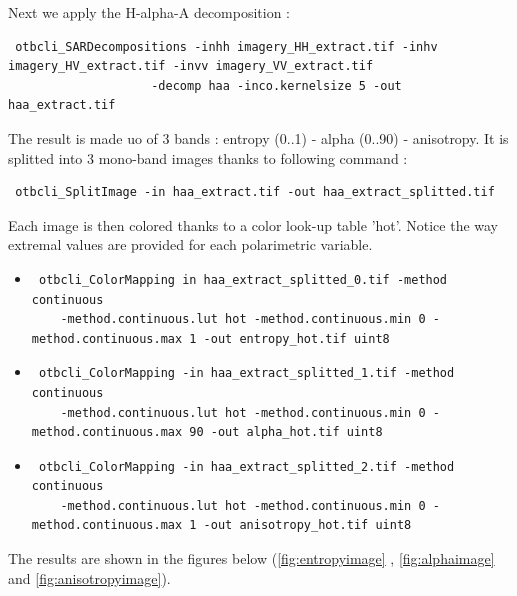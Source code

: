 Next we apply the H-alpha-A decomposition :

\begin{verbatim} otbcli_SARDecompositions -inhh imagery_HH_extract.tif -inhv imagery_HV_extract.tif -invv imagery_VV_extract.tif 
					-decomp haa -inco.kernelsize 5 -out haa_extract.tif \end{verbatim}

The result is made uo of 3 bands : entropy (0..1) - alpha (0..90) - anisotropy. 
It is splitted into 3 mono-band images thanks to following command :

\begin{verbatim} otbcli_SplitImage -in haa_extract.tif -out haa_extract_splitted.tif \end{verbatim}

Each image is then colored thanks to a color look-up table 'hot'. 
Notice the way extremal values are provided for each polarimetric variable.

\begin{itemize}
\item \begin{verbatim} otbcli_ColorMapping in haa_extract_splitted_0.tif -method continuous 
    -method.continuous.lut hot -method.continuous.min 0 -method.continuous.max 1 -out entropy_hot.tif uint8 \end{verbatim}
									  
\item \begin{verbatim} otbcli_ColorMapping -in haa_extract_splitted_1.tif -method continuous 
    -method.continuous.lut hot -method.continuous.min 0 -method.continuous.max 90 -out alpha_hot.tif uint8 \end{verbatim}
									  
\item \begin{verbatim} otbcli_ColorMapping -in haa_extract_splitted_2.tif -method continuous 
    -method.continuous.lut hot -method.continuous.min 0 -method.continuous.max 1 -out anisotropy_hot.tif uint8 \end{verbatim}
\end{itemize}

The results are shown in the figures below (\ref{fig:entropyimage} , \ref{fig:alphaimage} and \ref{fig:anisotropyimage}).

